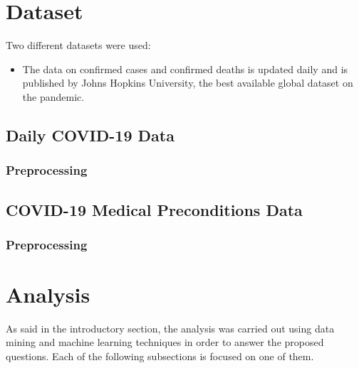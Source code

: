 \documentclass[11pt,a4paper]{article}
\begin{document}
\section{Dataset}
Two different datasets were used:
\begin{itemize}
    \item The data on confirmed cases and confirmed deaths is updated daily and
    is published by Johns Hopkins University, the best available global dataset
    on the pandemic.
\end{itemize}
\subsection{Daily COVID-19 Data}
\subsubsection{Preprocessing}
\subsection{COVID-19 Medical Preconditions Data}
\subsubsection{Preprocessing}

\section{Analysis}
As said in the introductory section, the analysis was carried out using data
mining and machine learning techniques in order to answer the proposed
questions. Each of the following subsections is focused on one of them.
\end{document}
